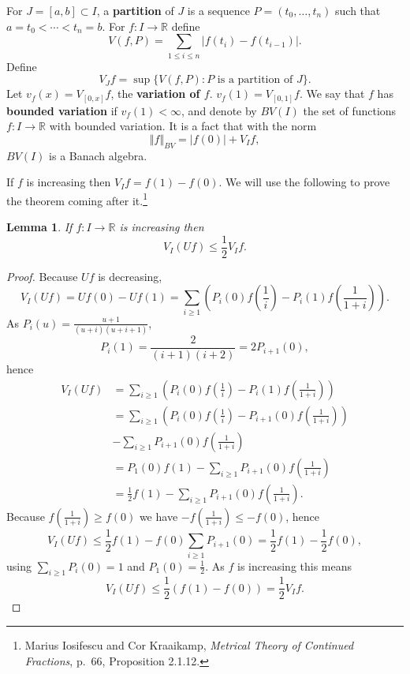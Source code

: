 \documentclass{article}
\newcommand{\norm}[1]{\left\Vert #1 \right\Vert}
\newtheorem{lemma}[theorem]{Lemma}
\theoremstyle{definition}
\begin{document}
For $J=[a,b] \subset I$, 
a \textbf{partition} of $J$ is a sequence $P=(t_0,\ldots,t_n)$ such that $a=t_0<\cdots<t_n=b$. 
For $f:I \to \mathbb{R}$ define
\[
V(f,P) = \sum_{1 \leq i \leq n} |f(t_i)-f(t_{i-1})|.
\]
Define
\[
V_J f = \sup\{V(f,P): \textrm{$P$ is a partition of $J$}\}.
\]
Let $v_f(x) = V_{[0,x]} f$, the \textbf{variation of $f$}. $v_f(1)=V_{[0,1]} f$. 
We say that $f$ has \textbf{bounded variation} if $v_f(1)< \infty$, and denote by $BV(I)$ the set of
functions $f:I \to \mathbb{R}$ with bounded variation. It is a fact that
with the norm
\[
\norm{f}_{BV} = |f(0)| + V_I f,
\]
$BV(I)$ is a Banach algebra.

If $f$ is increasing then $V_I f = f(1)-f(0)$. We will use the following to prove the theorem coming after it.\footnote{Marius Iosifescu and Cor Kraaikamp,
{\em Metrical Theory of Continued Fractions}, p.~66, Proposition 2.1.12.}

\begin{lemma}
If $f:I \to \mathbb{R}$ is increasing then 
\[
V_I (Uf) \leq \frac{1}{2} V_I f.
\]
\end{lemma}
\begin{proof}
Because $Uf$ is decreasing, 
\[
V_I(Uf) = Uf(0)-Uf(1) = \sum_{i \geq 1} \left( P_i(0)f\left(\frac{1}{i}\right) - P_i(1) f\left(\frac{1}{1+i}\right)\right).
\]
As $P_i(u)=\frac{u+1}{(u+i)(u+i+1)}$,
\[
P_i(1) = \frac{2}{(i+1)(i+2)} = 2P_{i+1}(0),
\]
hence 
\begin{align*}
V_I(Uf)&=\sum_{i \geq 1} \left( P_i(0)f\left(\frac{1}{i}\right) - P_i(1) f\left(\frac{1}{1+i}\right)\right)\\
&=\sum_{i \geq 1}  \left( P_i(0)f\left(\frac{1}{i}\right) - P_{i+1}(0) f\left(\frac{1}{1+i}\right)\right)\\
&-\sum_{i \geq 1} P_{i+1}(0) f\left(\frac{1}{1+i}\right)\\
&=P_1(0)f(1) -\sum_{i \geq 1} P_{i+1}(0) f\left(\frac{1}{1+i}\right)\\
&=\frac{1}{2}f(1) - \sum_{i \geq 1} P_{i+1}(0) f\left(\frac{1}{1+i}\right).
\end{align*}
Because $ f\left(\frac{1}{1+i}\right) \geq f(0)$ we have  $- f\left(\frac{1}{1+i}\right) \leq - f(0)$, hence 
\[
V_I(Uf) \leq \frac{1}{2}f(1) -f(0) \sum_{i \geq 1} P_{i+1}(0) = \frac{1}{2}f(1)  - \frac{1}{2}f(0),
\]
using $\sum_{i \geq 1} P_i(0) = 1$ and $P_1(0)=\frac{1}{2}$. 
As $f$ is increasing this means
\[
V_I(Uf) \leq \frac{1}{2}(f(1)-f(0)) = \frac{1}{2} V_I f.
\]
\end{proof}
\end{document}
